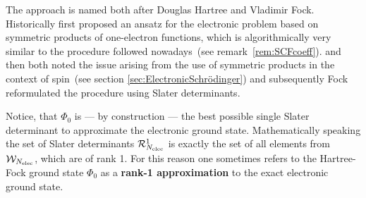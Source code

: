 The \HF approach is named both
after Douglas Hartree and Vladimir Fock.
Historically \citet{Hartree1928} first proposed
an ansatz for the electronic problem
based on symmetric products of one-electron functions, which is algorithmically very similar to the procedure followed
nowadays~(see remark~\vref{rem:SCFcoeff}).
\citet{Slater1930a}
and \citet{Fock1930} then both noted
the issue arising from the use of symmetric
products in the context of spin~(see section \vref{sec:ElectronicSchrödinger})
and subsequently Fock reformulated the procedure
using Slater determinants.

Notice, that $\Phi_0$ is --- by construction ---
the best possible single Slater determinant to
approximate the electronic ground state.
Mathematically speaking the set of Slater determinants
$\mathcal{R}^1_{N_\text{elec}}$
is exactly the set of all elements from $\mathcal{W}_{N_\text{elec}}$,
which are of rank 1.
For this reason one sometimes refers to the Hartree-Fock
ground state $\Phi_0$
as a \textbf{rank-1 approximation} to the exact
electronic ground state.

